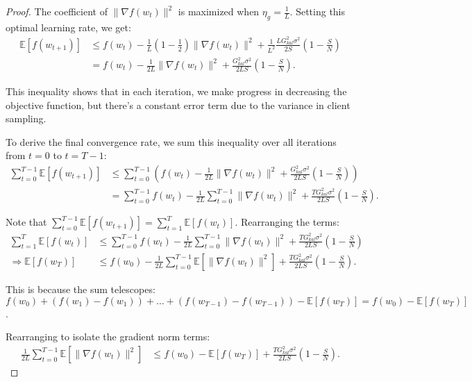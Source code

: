 \begin{proof}
    The coefficient of \(\|\nabla f(w_t)\|^2\) is maximized when \(\eta_g = \frac{1}{L}\). Setting this optimal learning rate, we get:
    \begin{align*}
        \mathbb{E}[f(w_{t+1})] &\leq f(w_t) - \frac{1}{L} \left(1 - \frac{1}{2}\right) \|\nabla f(w_t)\|^2 + \frac{1}{L^2} \frac{L G_{kal}^2 \sigma^2}{2S} \left(1 - \frac{S}{N}\right) \\
        &= f(w_t) - \frac{1}{2L} \|\nabla f(w_t)\|^2 + \frac{G_{kal}^2 \sigma^2}{2LS} \left(1 - \frac{S}{N}\right).
    \end{align*}
    
    This inequality shows that in each iteration, we make progress in decreasing the objective function, but there's a constant error term due to the variance in client sampling.
    
    To derive the final convergence rate, we sum this inequality over all iterations from \(t = 0\) to \(t = T-1\):
    \begin{align*}
        \sum_{t=0}^{T-1} \mathbb{E}[f(w_{t+1})] &\leq \sum_{t=0}^{T-1} \left( f(w_t) - \frac{1}{2L} \|\nabla f(w_t)\|^2 + \frac{G_{kal}^2 \sigma^2}{2LS} \left(1 - \frac{S}{N}\right) \right) \\
        &= \sum_{t=0}^{T-1} f(w_t) - \frac{1}{2L} \sum_{t=0}^{T-1} \|\nabla f(w_t)\|^2 + \frac{T G_{kal}^2 \sigma^2}{2LS} \left(1 - \frac{S}{N}\right).
    \end{align*}
    
    Note that \(\sum_{t=0}^{T-1} \mathbb{E}[f(w_{t+1})] = \sum_{t=1}^{T} \mathbb{E}[f(w_t)]\). Rearranging the terms:
    \begin{align*}
        \sum_{t=1}^{T} \mathbb{E}[f(w_t)] &\leq \sum_{t=0}^{T-1} f(w_t) - \frac{1}{2L} \sum_{t=0}^{T-1} \|\nabla f(w_t)\|^2 + \frac{T G_{kal}^2 \sigma^2}{2LS} \left(1 - \frac{S}{N}\right) \\
        \Rightarrow \mathbb{E}[f(w_T)] &\leq f(w_0) - \frac{1}{2L} \sum_{t=0}^{T-1} \mathbb{E}[\|\nabla f(w_t)\|^2] + \frac{T G_{kal}^2 \sigma^2}{2LS} \left(1 - \frac{S}{N}\right).
    \end{align*}
    
    This is because the sum telescopes: \(f(w_0) + (f(w_1) - f(w_1)) + \ldots + (f(w_{T-1}) - f(w_{T-1})) - \mathbb{E}[f(w_T)] = f(w_0) - \mathbb{E}[f(w_T)]\).
    
    Rearranging to isolate the gradient norm terms:
    \begin{align*}
        \frac{1}{2L} \sum_{t=0}^{T-1} \mathbb{E}[\|\nabla f(w_t)\|^2] &\leq f(w_0) - \mathbb{E}[f(w_T)] + \frac{T G_{kal}^2 \sigma^2}{2LS} \left(1 - \frac{S}{N}\right).
    \end{align*}
    

\end{proof}
